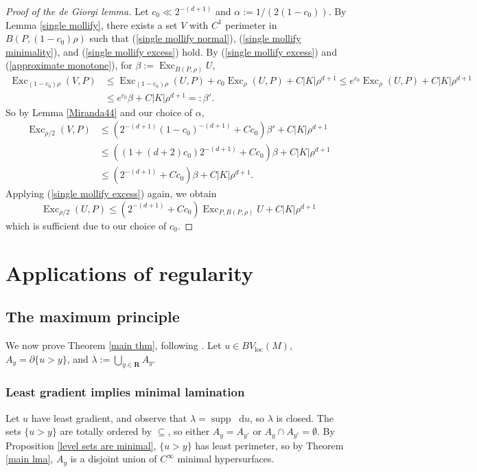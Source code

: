 \documentclass[reqno,10pt]{amsart}
\newcommand{\RR}{\mathbf{R}}
\DeclareMathOperator{\Exc}{Exc}
\DeclareMathOperator{\supp}{supp}
\newcommand*\dif{\mathop{}\!\mathrm{d}}
\newcommand{\loc}{\mathrm{loc}}
\theoremstyle{definition}
\numberwithin{equation}{section}
\begin{document}
\begin{proof}[Proof of the de Giorgi lemma]
Let $c_0 \ll 2^{-(d + 1)}$ and $\alpha := 1/(2(1 - c_0))$.
By Lemma \ref{single mollify}, there exists a set $V$ with $C^1$ perimeter in $B(P, (1 - c_0)\rho)$ such that (\ref{single mollify normal}), (\ref{single mollify minimality}), and (\ref{single mollify excess}) hold.
By (\ref{single mollify excess}) and (\ref{approximate monotone}), for $\beta := \Exc_{B(P, \rho)} U$,
\begin{align*}
\Exc_{(1 - c_0) \rho} (V, P) &\leq \Exc_{(1 - c_0) \rho} (U, P) + c_0 \Exc_\rho (U, P) + C|K| \rho^{d + 1} \leq e^{c_0} \Exc_\rho (U, P) + C |K| \rho^{d + 1} \\
&\leq e^{c_0} \beta + C |K| \rho^{d + 1} =: \beta'.
\end{align*}
So by Lemma \ref{Miranda44} and our choice of $\alpha$,
\begin{align*}
\Exc_{\rho/2} (V, P) &\leq (2^{-(d + 1)} (1 - c_0)^{-(d + 1)} + Cc_0) \beta' + C |K| \rho^{d + 1} \\
&\leq ((1 + (d + 2) c_0) 2^{-(d + 1)} + Cc_0) \beta + C |K| \rho^{d + 1} \\
&\leq (2^{-(d + 1)} + Cc_0) \beta + C |K| \rho^{d + 1}.
\end{align*}
Applying (\ref{single mollify excess}) again, we obtain
$$\Exc_{\rho/2} (U, P) \leq (2^{-(d + 1)} + Cc_0) \Exc_{P, B(P, \rho)} U + C|K|\rho^{d + 1}$$
which is sufficient due to our choice of $c_0$.
\end{proof}


\section{Applications of regularity}\label{GornySec}

\subsection{The maximum principle}\label{Max Princip}
We now prove Theorem \ref{main thm}, following \cite[\S3]{górny2017planar}. Let $u \in BV_\loc(M)$, $A_y = \partial \{u > y\}$, and $\lambda := \bigcup_{y \in \RR} A_y$.

\subsubsection{Least gradient implies minimal lamination}
Let $u$ have least gradient, and observe that $\lambda = \supp \dif u$, so $\lambda$ is closed.
The sets $\{u > y\}$ are totally ordered by $\subseteq$, so either $A_y = A_{y'}$ or $A_y \cap A_{y'} = \emptyset$.
By Proposition \ref{level sets are minimal}, $\{u > y\}$ has least perimeter, so by Theorem \ref{main lma}, $A_y$ is a disjoint union of $C^\infty$ minimal hypersurfaces.
\end{document}
